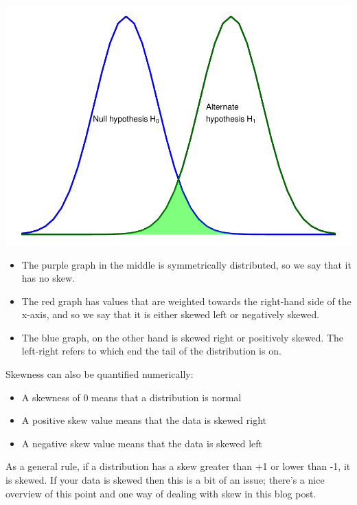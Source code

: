 \documentclass[
]{book}
\providecommand{\tightlist}{%
  \setlength{\itemsep}{0pt}\setlength{\parskip}{0pt}}
\begin{document}
\begin{center}\includegraphics{_main_files/figure-latex/unnamed-chunk-82-1} \end{center}

\begin{itemize}
\tightlist
\item
  The purple graph in the middle is symmetrically distributed, so we say that it has no skew.
\item
  The red graph has values that are weighted towards the right-hand side of the x-axis, and so we say that it is either skewed left or negatively skewed.
\item
  The blue graph, on the other hand is skewed right or positively skewed. The left-right refers to which end the tail of the distribution is on.
\end{itemize}

Skewness can also be quantified numerically:

\begin{itemize}
\tightlist
\item
  A skewness of 0 means that a distribution is normal
\item
  A positive skew value means that the data is skewed right
\item
  A negative skew value means that the data is skewed left
\end{itemize}

As a general rule, if a distribution has a skew greater than +1 or lower than -1, it is skewed. If your data is skewed then this is a bit of an issue; there's a nice overview of this point and one way of dealing with skew in this blog post.
\end{document}
